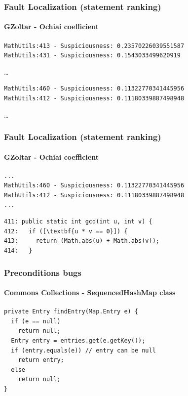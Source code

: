 \documentclass[onlymath]{beamer}
\begin{document}
\begin{frame}[fragile]
\frametitle{Fault Localization (statement ranking)}
\framesubtitle{GZoltar - Ochiai coefficient}
\begin{verbatim}
MathUtils:413 - Suspiciousness: 0.23570226039551587
MathUtils:431 - Suspiciousness: 0.1543033499620919
\end{verbatim}
\dots
\begin{verbatim}
MathUtils:460 - Suspiciousness: 0.11322770341445956
MathUtils:412 - Suspiciousness: 0.11180339887498948
\end{verbatim}
\dots
\end{frame}


\begin{frame}[fragile]
\frametitle{Fault Localization (statement ranking)}
\framesubtitle{GZoltar - Ochiai coefficient}
\begin{verbatim}
...
MathUtils:460 - Suspiciousness: 0.11322770341445956
MathUtils:412 - Suspiciousness: 0.11180339887498948
...
\end{verbatim}

\begin{lstlisting}[escapeinside=\[\]]
411: public static int gcd(int u, int v) {
412:   if ([\textbf{u * v == 0}]) {
413:     return (Math.abs(u) + Math.abs(v));
414:   }
\end{lstlisting}
\end{frame}








 \begin{frame}[fragile]
    \frametitle{Preconditions bugs}
      \framesubtitle{Commons Collections - SequencedHashMap class}
\begin{lstlisting}
private Entry findEntry(Map.Entry e) {
  if (e == null)
    return null;
  Entry entry = entries.get(e.getKey());
  if (entry.equals(e)) // entry can be null
    return entry;
  else
    return null;
}
\end{lstlisting}
\end{frame}
\end{document}
